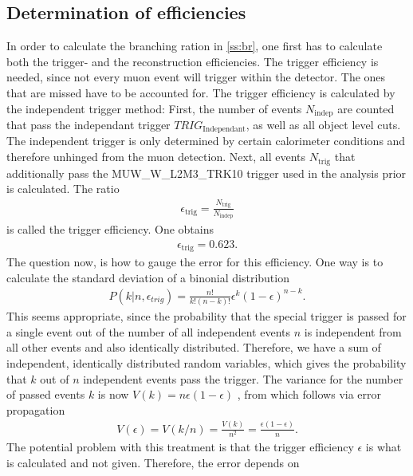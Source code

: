 \documentclass[twoside,        %
               BCOR12mm,       %
               ngerman,english, %
               fleqn,headsepline=false,footsepline=false
              ]{Vorlage/MFPREPORT}
\begin{document}
\subsection{Determination of efficiencies}
In order to calculate the branching ration in \cref{ss:br}, one first has to
calculate both the trigger- and the reconstruction efficiencies. The trigger
efficiency is needed, since not every muon event will trigger within the
detector. The ones that are missed have to be accounted for. The trigger
efficiency is calculated by the independent trigger method: First, the number
of events $N_\text{indep}$ are counted that pass the independant trigger
$TRIG_\text{Independant}$, as well as all object level cuts.
The independent trigger is only determined by certain calorimeter conditions and therefore
unhinged from the muon detection. Next, all events $N_\text{trig}$ that
additionally pass the MUW\_W\_L2M3\_TRK10 trigger used in the analysis prior is
calculated.
The ratio
\begin{align}
    \label{eq:trigeff}
    \epsilon_\text{trig}=\frac{N_\text{trig}}{N_\text{indep}}
\end{align}
is called the trigger efficiency.
One obtains
\begin{align}
    \label{eq:trigeffvalue}
    \epsilon_\text{trig}=0.623.
\end{align}
The question now, is how to gauge the error for this efficiency. One way is to
calculate the standard deviation of a binonial distribution
\begin{align}
    \label{eq:binomial}
    P(k|n,\epsilon_{trig})=\frac{n!}{k!(n-k)!}\epsilon^k(1-\epsilon)^{n-k}.
\end{align}
This seems appropriate, since the probability that the special trigger is
passed for a single event out of the number of all independent events $n$ is
independent from all other events and also identically distributed. Therefore,
we have a sum of independent, identically distributed random variables, which
gives the probability that $k$ out of $n$ independent events pass the
trigger. The variance for the number of passed events $k$ is now
$V(k)=n\epsilon(1-\epsilon)$ \cite{efferror}, from which follows via error
propagation
\begin{align}
    \label{eq:kstd}
    V(\epsilon)=V(k/n)=\frac{V(k)}{n^2}=\frac{\epsilon(1-\epsilon)}{n}.
\end{align}
The potential problem with this treatment is that the trigger efficiency
$\epsilon$ is what is calculated and not given. Therefore, the error depends on
\end{document}
